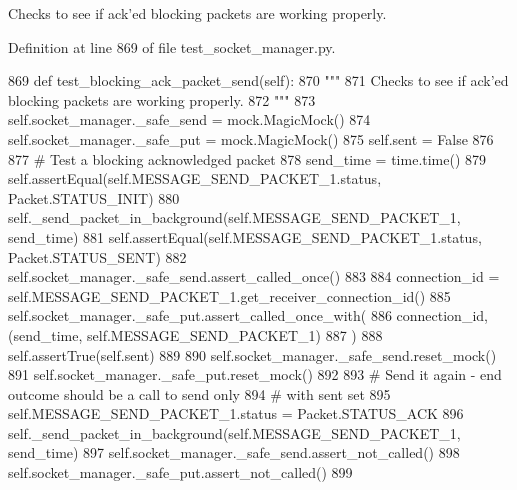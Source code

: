 \begin{DoxyVerb}Checks to see if ack'ed blocking packets are working properly.
\end{DoxyVerb}
 

Definition at line 869 of file test\+\_\+socket\+\_\+manager.\+py.


\begin{DoxyCode}
869     \textcolor{keyword}{def }test\_blocking\_ack\_packet\_send(self):
870         \textcolor{stringliteral}{"""}
871 \textcolor{stringliteral}{        Checks to see if ack'ed blocking packets are working properly.}
872 \textcolor{stringliteral}{        """}
873         self.socket\_manager.\_safe\_send = mock.MagicMock()
874         self.socket\_manager.\_safe\_put = mock.MagicMock()
875         self.sent = \textcolor{keyword}{False}
876 
877         \textcolor{comment}{# Test a blocking acknowledged packet}
878         send\_time = time.time()
879         self.assertEqual(self.MESSAGE\_SEND\_PACKET\_1.status, Packet.STATUS\_INIT)
880         self.\_send\_packet\_in\_background(self.MESSAGE\_SEND\_PACKET\_1, send\_time)
881         self.assertEqual(self.MESSAGE\_SEND\_PACKET\_1.status, Packet.STATUS\_SENT)
882         self.socket\_manager.\_safe\_send.assert\_called\_once()
883 
884         connection\_id = self.MESSAGE\_SEND\_PACKET\_1.get\_receiver\_connection\_id()
885         self.socket\_manager.\_safe\_put.assert\_called\_once\_with(
886             connection\_id, (send\_time, self.MESSAGE\_SEND\_PACKET\_1)
887         )
888         self.assertTrue(self.sent)
889 
890         self.socket\_manager.\_safe\_send.reset\_mock()
891         self.socket\_manager.\_safe\_put.reset\_mock()
892 
893         \textcolor{comment}{# Send it again - end outcome should be a call to send only}
894         \textcolor{comment}{# with sent set}
895         self.MESSAGE\_SEND\_PACKET\_1.status = Packet.STATUS\_ACK
896         self.\_send\_packet\_in\_background(self.MESSAGE\_SEND\_PACKET\_1, send\_time)
897         self.socket\_manager.\_safe\_send.assert\_not\_called()
898         self.socket\_manager.\_safe\_put.assert\_not\_called()
899 
\end{DoxyCode}
\mbox{\label{classparlai_1_1mturk_1_1core_1_1test_1_1test__socket__manager_1_1TestSocketManagerRoutingFunctionality_a8ee3ef59cf53f6c3ee50e0dd5db882fc}} 
